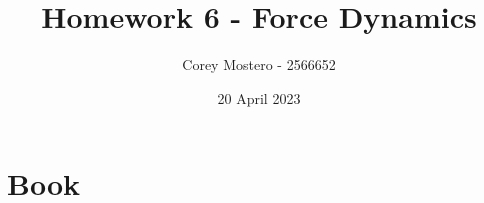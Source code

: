 \documentclass{article}
\title{Homework 6 - Force Dynamics}
\author{Corey Mostero - 2566652}
\date{20 April 2023}
\begin{document}
\newcommand{\hr}{\par\noindent\rule{\textwidth}{0.4pt}}

\newcommand{\bc}[1]{
	\begin{equation*}
		\begin{boxed}
			{#1}
		\end{boxed}
	\end{equation*}
}

\newcommand{\cond}[2]{
	\ifmmode
		{#1} \quad {#2}
	\else
		$$ {#1} \quad {#2} $$
	\fi
}

\maketitle
\newpage

\tableofcontents

\section{Book}
\end{document}
